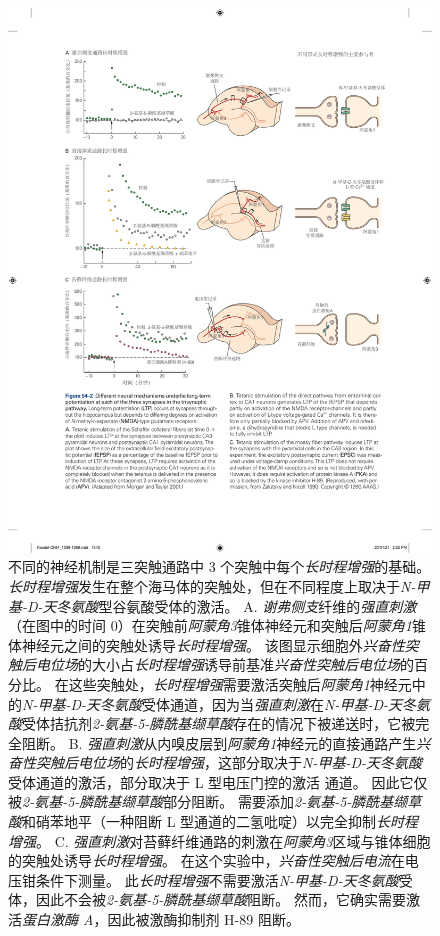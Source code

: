 \begin{figure}[htbp]
	\centering
	\includegraphics[width=1.0\linewidth]{chap54/fig_54_2}
	\caption{不同的神经机制是三突触通路中 3 个突触中每个\textit{长时程增强}的基础。
		\textit{长时程增强}发生在整个海马体的突触处，但在不同程度上取决于\textit{N-甲基-D-天冬氨酸}型谷氨酸受体的激活。
		A. \textit{谢弗侧支}纤维的\textit{强直刺激}（在图中的时间 0）在突触前\textit{阿蒙角3}锥体神经元和突触后\textit{阿蒙角1}锥体神经元之间的突触处诱导\textit{长时程增强}。
		该图显示细胞外\textit{兴奋性突触后电位场}的大小占\textit{长时程增强}诱导前基准\textit{兴奋性突触后电位场}的百分比。
		在这些突触处，\textit{长时程增强}需要激活突触后\textit{阿蒙角1}神经元中的\textit{N-甲基-D-天冬氨酸}受体通道，因为当\textit{强直刺激}在\textit{N-甲基-D-天冬氨酸}受体拮抗剂\textit{2-氨基-5-膦酰基缬草酸}存在的情况下被递送时，它被完全阻断\cite{morgan2001electrical}。
		B. \textit{强直刺激}从内嗅皮层到\textit{阿蒙角1}神经元的直接通路产生\textit{兴奋性突触后电位场}的\textit{长时程增强}，这部分取决于\textit{N-甲基-D-天冬氨酸}受体通道的激活，部分取决于 L 型电压门控的激活  通道。
		因此它仅被\textit{2-氨基-5-膦酰基缬草酸}部分阻断。
		需要添加\textit{2-氨基-5-膦酰基缬草酸}和硝苯地平（一种阻断 L 型通道的二氢吡啶）以完全抑制\textit{长时程增强}。
		C. \textit{强直刺激}对苔藓纤维通路的刺激在\textit{阿蒙角3}区域与锥体细胞的突触处诱导\textit{长时程增强}。
		在这个实验中，\textit{兴奋性突触后电流}在电压钳条件下测量。
		此\textit{长时程增强}不需要激活\textit{N-甲基-D-天冬氨酸}受体，因此不会被\textit{2-氨基-5-膦酰基缬草酸}阻断。
		然而，它确实需要激活\textit{蛋白激酶 A}，因此被激酶抑制剂 H-89 阻断\cite{zalutsky1990comparison}。}
	\label{fig:54_2}
\end{figure}


